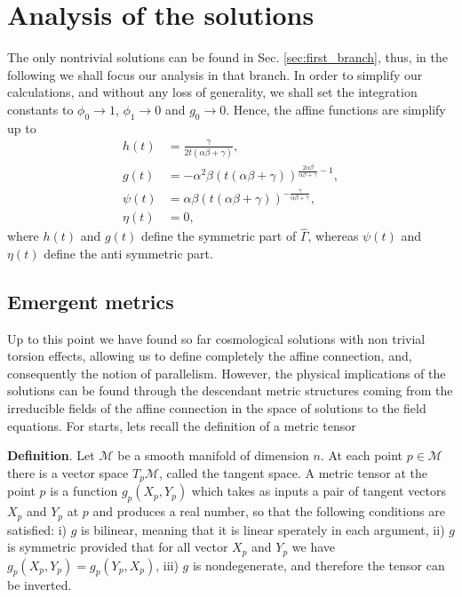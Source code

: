 \section{Analysis of the solutions}
\label{sec:analysis}

The only nontrivial solutions can be found in Sec. \ref{sec:first_branch}, thus, in the following we shall
focus our analysis in that branch. In order to simplify our calculations, and without any loss of generality, we shall
set the integration constants to $\phi_0 \to 1$, $\phi_1 \to 0$ and $g_0 \to 0$. Hence, the affine functions 
are simplify up to
\begin{align}
	h(t) & = \frac{\gamma}{2t\left(\alpha\beta + \gamma\right)}, \label{sol_h}\\
	g(t) & = -\alpha^2\beta \left(t\left(\alpha\beta + \gamma\right)\right)^{\frac{2\alpha\beta}{\alpha\beta + \gamma} -1}, \label{sol_g} \\
	\psi(t) & = \alpha\beta\left(t\left(\alpha\beta + \gamma\right)\right)^{-\frac{\gamma}{\alpha\beta + \gamma}},  \label{sol_p}\\ 
	\eta(t) & = 0, \label{sol_n}
\end{align}
where $h(t)$ and $g(t)$ define the symmetric part of $\hat{\Gamma}$, whereas
$\psi(t)$ and $\eta(t)$ define the anti symmetric part.

\subsection{Emergent metrics}

Up to this point we have found so far cosmological solutions with non trivial torsion
effects, allowing us to define completely the affine connection, and, consequently
the notion of parallelism. However, the physical implications of the solutions can be
found through the descendant metric structures coming from the irreducible fields 
of the affine connection in the space of solutions to the field equations. 
For starts, lets recall the definition of a metric tensor

\textbf{Definition}. Let $\mathcal{M}$ be a smooth manifold of dimension $n$. At each
point $p \in \mathcal{M}$ there is a vector space $T_p\mathcal{M}$, called the tangent
space. A metric tensor at the point $p$ is a function $g_p (X_p, Y_p)$ which takes as 
inputs a pair of tangent vectors $X_p$ and $Y_p$ at $p$ and produces a real number, 
so that the following conditions are satisfied: i) $g$ is bilinear, meaning that it is
linear sperately in each argument, ii) $g$ is symmetric provided that for all vector $X_p$ and
$Y_p$ we have $g_p(X_p, Y_p) = g_p (Y_p, X_p)$, iii) $g$ is nondegenerate, and therefore the
tensor can be inverted.

